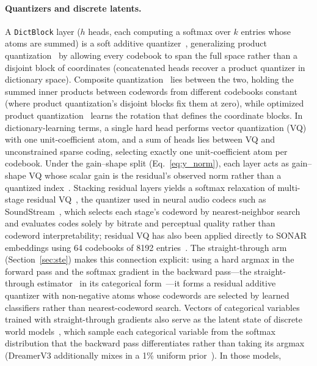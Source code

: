 \paragraph{Quantizers and discrete latents.}
A \texttt{DictBlock} layer ($h$ heads, each computing a softmax over $k$
entries whose atoms are summed) is a soft additive
quantizer~\cite{babenko2014}, generalizing product
quantization~\cite{jegou2011} by allowing every codebook to span the full
space rather than a disjoint block of coordinates (concatenated heads
recover a product quantizer in dictionary space). Composite
quantization~\cite{zhang2014composite} lies between the two, holding the
summed inner products between codewords from different codebooks constant
(where product quantization's disjoint blocks fix them at zero), while
optimized product quantization~\cite{ge2014} learns the rotation that
defines the coordinate blocks. In dictionary-learning terms, a single
hard head performs vector quantization (VQ) with one unit-coefficient
atom, and a sum of heads lies between VQ and unconstrained sparse coding,
selecting exactly one unit-coefficient atom per codebook. Under the
gain--shape split (Eq.~\eqref{eq:y_norm}), each layer acts as gain--shape
VQ whose scalar gain is the residual's observed norm rather than a
quantized index~\cite{aharon2006}. Stacking residual layers yields a
softmax relaxation of multi-stage residual
VQ~\cite{juang1982,barnes1996}, the quantizer used in
neural audio codecs such as SoundStream~\cite{zeghidour2021}, which
selects each stage's codeword by nearest-neighbor search and evaluates
codes solely by bitrate and perceptual quality rather than codeword
interpretability; residual VQ has also been applied directly to SONAR
embeddings using 64 codebooks of 8192
entries~\cite{lcmteam2024largeconceptmodelslanguage}. The
straight-through arm (Section~\ref{sec:ste}) makes this connection
explicit: using a hard argmax in the forward pass and the softmax
gradient in the backward pass---the straight-through
estimator~\cite{bengio2013} in its categorical form~\cite{jang2017}---it
forms a residual additive quantizer with non-negative atoms whose
codewords are selected by learned classifiers rather than
nearest-codeword search. Vectors of categorical variables trained with
straight-through gradients also serve as the latent state of discrete
world models~\cite{hafner2021,hafner2023}, which sample each categorical
variable from the softmax distribution that the backward pass
differentiates rather than taking its argmax (DreamerV3 additionally
mixes in a 1\% uniform prior~\cite{hafner2023}). In those models,
